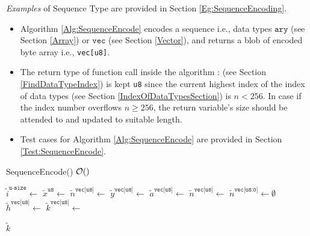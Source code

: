 \documentclass[../alan-handbook.tex]{subfiles}
\begin{document}
\textit{Examples} of Sequence Type are provided in Section \ref{Eg:SequenceEncoding}.

\label{SequenceEncode}

\begin{itemize}
    \item Algorithm \ref{Alg:SequenceEncode} encodes a sequence i.e., data types $\texttt{ary}$ (see Section \ref{Array}) or $\texttt{vec}$ (see Section \ref{Vector}), and returns a blob of encoded byte array i.e., \texttt{vec[u8]}. 
    \item The return type of function call inside the algorithm :  (see Section \ref{FindDataTypeIndex}) is kept \texttt{u8} since the current highest index of the index of data types (see Section \ref{IndexOfDataTypesSection}) is $n<256$. In case if the index number overflows $n\geq256$, the return variable's size should be attended to and updated to suitable length. 
    \item Test cases for Algorithm \ref{Alg:SequenceEncode} are provided in Section \ref{Test:SequenceEncode}.
\end{itemize}

\begin{algorithm}
\caption{SequenceEncode() \hfill $\mathcal{O}()$  }
\label{Alg:SequenceEncode}
\begin{algorithmic}[1]
    \State $\tilde{i}^{\texttt{u-size}} \gets$  \Comment{\ref{NumElements}} 
        \State $\tilde{x}^{\texttt{u8}} \gets$  \Comment{\ref{FindDataTypeIndex}}
            \State $\tilde{n}^{\texttt{vec[u8]}} \gets$ \Comment{\ref{IterateEncodeForSequence}}
        \Else 
                \State $\tilde{y}^{\texttt{vec[u8]}} \gets$  \Comment{\ref{LeByteArray}}
                \State $\tilde{a}^{\texttt{vec[u8]}} \gets$ \Comment{\ref{IterateValueEncodeForSequence}}
            \EndConcurrency
            \State $\tilde{n}^{\texttt{vec[u8]}} \gets$  \Comment{\ref{ConcatByteArrays}}
        \EndIf
    \Else 
        \State $\tilde{n}^{\texttt{vec[u8:0]}} \gets \emptyset$
    \EndIf
    \State $\tilde{h}^{\texttt{vec[u8]}} \gets$  \Comment{\ref{LengthEncode}} 
    \State $\tilde{k}^{\texttt{vec[u8]}} \gets$  \Comment{\ref{ConcatByteArrays}} 

    \Return $\tilde{k}$
\EndFunction
\end{algorithmic}
\end{algorithm}
\end{document}
